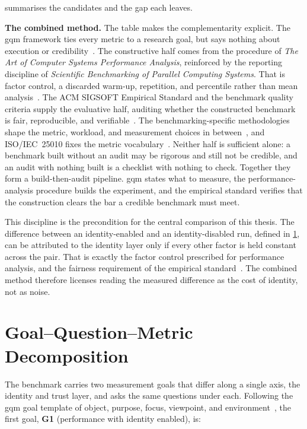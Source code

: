  summarises the candidates and the gap each leaves.

\textbf{The combined method.} The table makes the complementarity explicit. The \gls{gqm} framework ties every metric to a research goal, but says nothing about execution or credibility~\citep{caldiera1994goal}. The constructive half comes from the procedure of \emph{The Art of Computer Systems Performance Analysis}, reinforced by the reporting discipline of \emph{Scientific Benchmarking of Parallel Computing Systems}. That is factor control, a discarded warm-up, repetition, and percentile rather than mean analysis~\citep{jain1991art, hoefler2015scientific}. The ACM SIGSOFT Empirical Standard and the benchmark quality criteria supply the evaluative half, auditing whether the constructed benchmark is fair, reproducible, and verifiable~\citep{Ralph2020, empiricalStandardsBenchmarking, huppler2009art}. The benchmarking-specific methodologies shape the metric, workload, and measurement choices in between~\citep{kounev2020systems, bermbach2017cloud}, and ISO/IEC~25010 fixes the metric vocabulary~\citep{iso25010}. Neither half is sufficient alone: a benchmark built without an audit may be rigorous and still not be credible, and an audit with nothing built is a checklist with nothing to check. Together they form a build-then-audit pipeline. \Gls{gqm} states what to measure, the performance-analysis procedure builds the experiment, and the empirical standard verifies that the construction clears the bar a credible benchmark must meet.

This discipline is the precondition for the central comparison of this thesis. The difference between an identity-enabled and an identity-disabled run, defined in \cref{sec:gqm-decomposition}, can be attributed to the identity layer only if every other factor is held constant across the pair. That is exactly the factor control prescribed for performance analysis, and the fairness requirement of the empirical standard~\citep{jain1991art, Ralph2020}. The combined method therefore licenses reading the measured difference as the cost of identity, not as noise.


\section{Goal--Question--Metric Decomposition}\label{sec:gqm-decomposition}

The benchmark carries two measurement goals that differ along a single axis, the identity and trust layer, and asks the same questions under each. Following the \gls{gqm} goal template of object, purpose, focus, viewpoint, and environment~\citep{caldiera1994goal}, the first goal, \textbf{G1} (performance with identity enabled), is:

